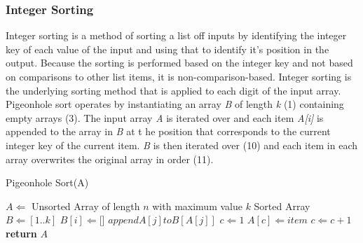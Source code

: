 \documentclass[12pt]{article}
\begin{document}
	\subsubsection{Integer Sorting}
	Integer sorting is a method of sorting a list off inputs by identifying the integer key of each value of the input and using that to identify it's position in the output. Because the sorting is performed based on the integer key and not based on comparisons to other list items, it is non-comparison-based. Integer sorting is the underlying sorting method that is applied to each digit of the input array.
	\label{ssec:pigeonhole}
	Pigeonhole sort operates by instantiating an array \textit{B} of length \textit{k} (1) containing empty arrays (3). The input array \textit{A} is iterated over and each item \textit{A[i]} is appended to the array in \textit{B} at t he position that corresponds to the current integer key of the current item. \textit{B} is then iterated over (10) and each item in each array overwrites the original array in order (11). 
	\begin{algorithm}[H] %
		\caption{Pigeonhole Sort({A})} %
		\label{alg1} %
		\begin{algorithmic}[1] %
			\REQUIRE $A \Leftarrow$ Unsorted Array of length $n$ with maximum value $k$
			\ENSURE Sorted Array
			\STATE $B \Leftarrow [1..k]$ 
			\STATE $B[i] \Leftarrow [$\space$]$ 
			\ENDFOR
			\STATE $append$\space$ A[j]$\space$ to$\space$ B[A[j]]$ 
			\ENDFOR
			\STATE $c \Leftarrow 1$ 
			\STATE $A[c] \Leftarrow item$ 
			\STATE $c \Leftarrow c + 1$		
			\ENDFOR
			\ENDFOR
			\STATE \textbf{return} $A$
		\end{algorithmic}
	\end{algorithm}
\end{document}
